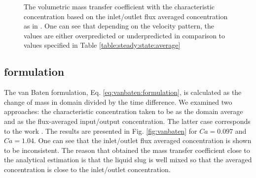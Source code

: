 \documentclass{article}
\begin{document}
\begin{figure}[htb!]
\caption{The volumetric mass transfer coefficient
with the characteristic concentration based on
the inlet/outlet flux averaged concentration as
in \cite{vanbaten-circular}. One can see that depending on the velocity pattern,
 the values are either overpredicted or underpredicted
in comparison to values specified in Table \ref{table:steady:state:average} 
\label{fig:volumetric:char:concentration:vanbaten}}
\end{figure}

\subsection{\citeauthor{vanbaten-circular} formulation}
\label{results:vanbaten}
The van Baten formulation, Eq. \ref{eq:vanbaten:formulation}, is calculated as
the change of mass in domain divided by the time difference. We examined two
approaches:  the characteristic concentration taken to be as the domain average
and as the flux-averaged input/output concentration. The latter case
corresponds to the work \cite{vanbaten-circular}. The results are presented in
Fig. \ref{fig:vanbaten} for $Ca=0.097$ and $Ca=1.04$. One can see that the
inlet/outlet flux averaged concentration is shown to be inconsistent. The
reason that \citet{vanbaten-circular} obtained the mass transfer coefficient
close to the analytical estimation is that the liquid slug is well mixed so that
the averaged concentration is close to the inlet/outlet concentration.
\end{document}
